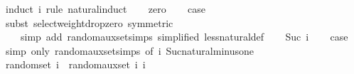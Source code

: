 \begin{isabellebody}
%
\isadelimproof
%
\endisadelimproof
%
\isatagproof
{}\isamarkupfalse%
\ {\isacharparenleft}{\kern0pt}induct\ i\ rule{\isacharcolon}{\kern0pt}\ natural{\isachardot}{\kern0pt}induct{\isacharparenright}{\kern0pt}\isanewline
\ \ \isamarkupfalse%
\ zero\isanewline
\ \ \isamarkupfalse%
\ {\isacharquery}{\kern0pt}case\ \isamarkupfalse%
\ {\isacharparenleft}{\kern0pt}subst\ select{\isacharunderscore}{\kern0pt}weight{\isacharunderscore}{\kern0pt}drop{\isacharunderscore}{\kern0pt}zero\ {\isacharbrackleft}{\kern0pt}symmetric{\isacharbrackright}{\kern0pt}{\isacharparenright}{\kern0pt}\isanewline
\ \ \ \ {\isacharparenleft}{\kern0pt}simp\ add{\isacharcolon}{\kern0pt}\ random{\isacharunderscore}{\kern0pt}aux{\isacharunderscore}{\kern0pt}set{\isachardot}{\kern0pt}simps\ {\isacharbrackleft}{\kern0pt}simplified{\isacharbrackright}{\kern0pt}\ less{\isacharunderscore}{\kern0pt}natural{\isacharunderscore}{\kern0pt}def{\isacharparenright}{\kern0pt}\isanewline
{}\isamarkupfalse%
\isanewline
\ \ \isamarkupfalse%
\ {\isacharparenleft}{\kern0pt}Suc\ i{\isacharparenright}{\kern0pt}\isanewline
\ \ \isamarkupfalse%
\ {\isacharquery}{\kern0pt}case\ \isamarkupfalse%
\ {\isacharparenleft}{\kern0pt}simp\ only{\isacharcolon}{\kern0pt}\ random{\isacharunderscore}{\kern0pt}aux{\isacharunderscore}{\kern0pt}set{\isachardot}{\kern0pt}simps{\isacharparenleft}{\kern0pt}{}{\isacharparenright}{\kern0pt}\ {\isacharbrackleft}{\kern0pt}of\ {\isachardoublequoteopen}i{\isachardoublequoteclose}{\isacharbrackright}{\kern0pt}\ Suc{\isacharunderscore}{\kern0pt}natural{\isacharunderscore}{\kern0pt}minus{\isacharunderscore}{\kern0pt}one{\isacharparenright}{\kern0pt}\isanewline
{}\isamarkupfalse%
%
\endisatagproof
{\isafoldproof}%
%
\isadelimproof
\isanewline
%
\endisadelimproof
\isanewline
{}\isamarkupfalse%
\ {\isachardoublequoteopen}random{\isacharunderscore}{\kern0pt}set\ i\ {\isacharequal}{\kern0pt}\ random{\isacharunderscore}{\kern0pt}aux{\isacharunderscore}{\kern0pt}set\ i\ i{\isachardoublequoteclose}\isanewline
\isanewline
{}\isamarkupfalse%
%
\isadelimproof
\ %
\endisadelimproof
%
\isatagproof
\isacommand{{\isachardot}{\kern0pt}{\isachardot}{\kern0pt}}\isamarkupfalse%
%
\endisatagproof
{\isafoldproof}%
%
\isadelimproof
%
\endisadelimproof
\isanewline
\isanewline
{}\isamarkupfalse%
\isanewline
\isanewline
{}\isamarkupfalse%
\isanewline
\isanewline
{}\isamarkupfalse%

\end{isabellebody}
